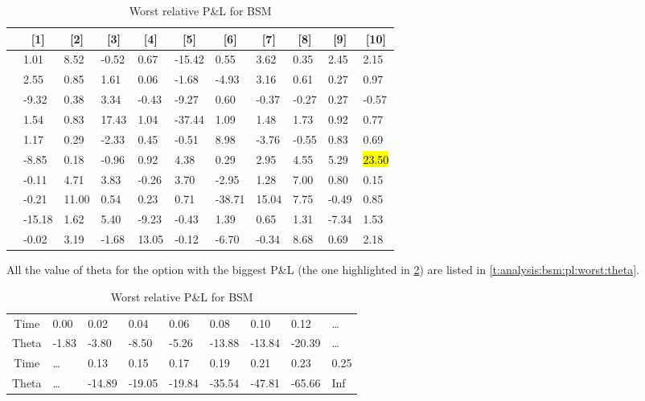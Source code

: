 \documentclass[12pt]{report}
\begin{document}
\begin{table}[ht]
\centering
\begin{tabular}{c|llllllllll}
  \hline
  \hline
  & \multicolumn{1}{c}{[1]} & \multicolumn{1}{c}{[2]} & \multicolumn{1}{c}{[3]} & \multicolumn{1}{c}{[4]} & \multicolumn{1}{c}{[5]} & \multicolumn{1}{c}{[6]} & \multicolumn{1}{c}{[7]} & \multicolumn{1}{c}{[8]} & \multicolumn{1}{c}{[9]} & \multicolumn{1}{c}{[10]} \\
  \hline
  [0] & 1.01 & 8.52 & -0.52 & 0.67 & -15.42 & 0.55 & 3.62 & 0.35 & 2.45 & 2.15 \\ \relax
  [10] & 2.55 & 0.85 & 1.61 & 0.06 & -1.68 & -4.93 & 3.16 & 0.61 & 0.27 & 0.97 \\ \relax
  [20] & -9.32 & 0.38 & 3.34 & -0.43 & -9.27 & 0.60 & -0.37 & -0.27 & 0.27 & -0.57 \\ \relax
  [30] & 1.54 & 0.83 & 17.43 & 1.04 & -37.44 & 1.09 & 1.48 & 1.73 & 0.92 & 0.77 \\ \relax
  [40] & 1.17 & 0.29 & -2.33 & 0.45 & -0.51 & 8.98 & -3.76 & -0.55 & 0.83 & 0.69 \\ \relax
  [50] & -8.85 & 0.18 & -0.96 & 0.92 & 4.38 & 0.29 & 2.95 & 4.55 & 5.29 & \hl{23.50} \\ \relax
  [60] & -0.11 & 4.71 & 3.83 & -0.26 & 3.70 & -2.95 & 1.28 & 7.00 & 0.80 & 0.15 \\ \relax
  [70] & -0.21 & 11.00 & 0.54 & 0.23 & 0.71 & -38.71 & 15.04 & 7.75 & -0.49 & 0.85 \\ \relax
  [80] & -15.18 & 1.62 & 5.40 & -9.23 & -0.43 & 1.39 & 0.65 & 1.31 & -7.34 & 1.53 \\ \relax
  [90] & -0.02 & 3.19 & -1.68 & 13.05 & -0.12 & -6.70 & -0.34 & 8.68 & 0.69 & 2.18 \\ 
   \hline
\end{tabular}
\caption{Worst relative P\&L for BSM} 
\label{t:analysis:bsm:pl:worst}
\end{table}

All the value of theta for the option with the biggest P\&L (the one highlighted in \cref{t:analysis:bsm:pl:worst}) are listed in \cref{t:analysis:bsm:pl:worst:theta}.


 
\begin{table}[ht]
\centering
\begin{tabular}{c|llllllll}
  \hline
  \hline
  Time & 0.00 & 0.02 & 0.04 & 0.06 & 0.08 & 0.10 & 0.12 & \ldots\\ 
Theta & -1.83 & -3.80 & -8.50 & -5.26 & -13.88 & -13.84 & -20.39 & \ldots \\ 
   \hdashline
  Time & \ldots & 0.13 & 0.15 & 0.17 & 0.19 & 0.21 & 0.23 & 0.25 \\ 
  Theta & \ldots & -14.89 & -19.05 & -19.84 & -35.54 & -47.81 & -65.66 & Inf \\ 
   \hline
\end{tabular}
\caption{Worst relative P\&L for BSM} 
\label{t:analysis:bsm:pl:worst}
\end{table}
\end{document}
